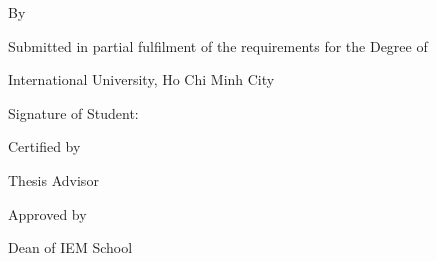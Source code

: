 \begin{titlepage}
\begin{singlespace}
\centering
{\fontsize{14}{18}\selectfont\bfseries \THESISTITLE\par}
\vspace{1.2cm}
By\par
\vspace{0.4cm}
{\fontsize{12}{15}\selectfont \studentname\par}
\vspace{1.2cm}
{\fontsize{14}{18}\selectfont Submitted in partial fulfilment of the
 requirements for the Degree of \degreename\par}
\vspace{0.8cm}
{\fontsize{14}{18}\selectfont International University, Ho Chi Minh City\\
 \thesisdate\par}
\vspace{2cm}
\raggedright
{\fontsize{14}{18}\selectfont
Signature of Student: \hrulefill\par
\hfill \studentname\par
\vspace{1.6cm}
Certified by \hrulefill\par
\hfill Thesis Advisor\par
\hfill \advisorname\par
\vspace{1.6cm}
Approved by \hrulefill\par
\hfill Dean of IEM School\par}
\end{singlespace}
\end{titlepage}
